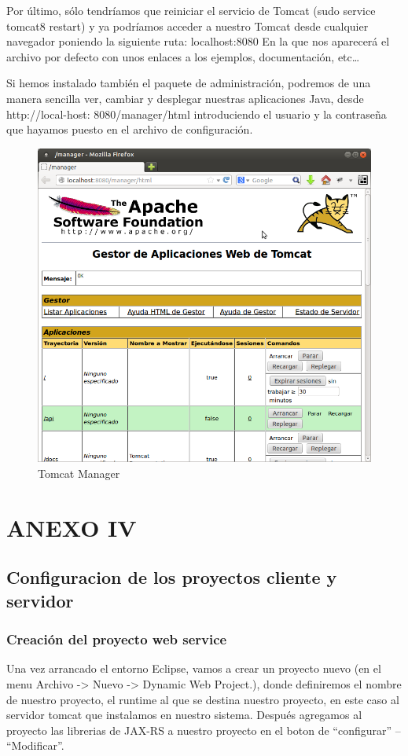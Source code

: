 Por último, sólo tendríamos que reiniciar el servicio de Tomcat (sudo service tomcat8 restart) y ya podríamos acceder a nuestro Tomcat desde cualquier navegador poniendo la siguiente ruta: localhost:8080 En la que nos aparecerá el archivo por defecto con unos enlaces a los ejemplos, documentación, etc…

Si hemos instalado también el paquete de administración, podremos de una manera sencilla ver, cambiar y desplegar nuestras aplicaciones Java, desde http://local-host: 8080/manager/html introduciendo el usuario y la contraseña que hayamos puesto en el archivo de configuración.


\begin{figure}[H]
	\centering
	\includegraphics[width=0.8\linewidth]{figuras/apache}
	\caption{Tomcat Manager}
	\label{fig:apache}
\end{figure}


\chapter{ANEXO IV}

\section{Configuracion de los proyectos cliente y servidor}

\subsection{Creación del proyecto web service}

Una vez arrancado el entorno Eclipse, vamos a crear un proyecto nuevo (en el menu Archivo -> Nuevo -> Dynamic Web Project.), donde definiremos el nombre de nuestro proyecto, el runtime al que se destina nuestro proyecto, en este caso al servidor tomcat que instalamos en nuestro sistema. Después agregamos al proyecto las librerias de JAX-RS a nuestro proyecto en el boton de “configurar” – “Modificar”.

